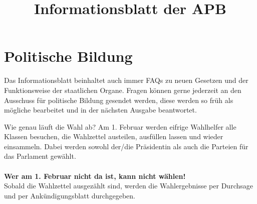 \documentclass{sasbase}
\begin{document}
\title{Informationsblatt der APB}

\setcounter{secnumdepth}{5}

\mytitle

\parensstyle

\section{Politische Bildung}
Das Informationsblatt beinhaltet auch immer FAQs zu neuen Gesetzen und der Funktionsweise der staatlichen Organe.
Fragen k\"{o}nnen gerne jederzeit an den Ausschuss f\"{u}r politische Bildung gesendet werden, diese werden so fr\"{u}h als m\"{o}gliche bearbeitet und in der n\"{a}chsten Ausgabe beantwortet.


\begin{question}{Wie genau läuft die Wahl ab?}
    Am 1. Februar werden eifrige Wahlhelfer alle Klassen besuchen, die Wahlzettel austeilen,
    ausfüllen lassen und wieder einsammeln. Dabei werden sowohl der/die Präsidentin als auch die
    Parteien für das Parlament gewählt.
    \\
    \\
    \noindent\textbf{Wer am 1. Februar nicht da ist, kann nicht wählen!}
    \\
    
    \noindent Sobald die Wahlzettel ausgezählt sind, werden die Wahlergebnisse per Durchsage und per
    Ankündigungsblatt durchgegeben.
\end{question}
\end{document}
